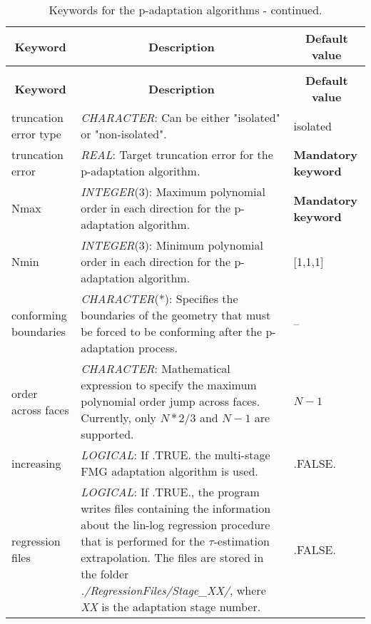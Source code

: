 \documentclass[a4paper,10pt]{report}
\begin{document}
\begin{longtable}{|p{4cm}|p{10cm}|p{2.2cm}|}
\caption{Keywords for the p-adaptation algorithms.} \label{tab:pAdaptationKey} \\
\hline
\multicolumn{1}{|c|}{\textbf{Keyword}} & \multicolumn{1}{c|}{\textbf{Description}} & \multicolumn{1}{c|}{\textbf{Default value}} \\ \hline
\endfirsthead

\caption{Keywords for the p-adaptation algorithms - continued.} \\
\hline
\multicolumn{1}{|c|}{\textbf{Keyword}} & \multicolumn{1}{c|}{\textbf{Description}} & \multicolumn{1}{c|}{\textbf{Default value}} \\ \hline
\endhead

truncation error type & \textit{CHARACTER}: Can be either "isolated" or "non-isolated". & isolated \\ \hline

truncation error & \textit{REAL}: Target truncation error for the p-adaptation algorithm. & \textbf{Mandatory keyword} \\ \hline

Nmax          & \textit{INTEGER}(3): Maximum polynomial order in each direction for the p-adaptation algorithm. & 
					\textbf{Mandatory keyword} \\ \hline

Nmin          & \textit{INTEGER}(3): Minimum polynomial order in each direction for the p-adaptation algorithm. & 
					[1,1,1] \\ \hline

conforming boundaries & \textit{CHARACTER}(*): Specifies the boundaries of the geometry that must be forced to be conforming after the p-adaptation process.  	  & 
					-- \\ \hline

order across faces &
			\textit{CHARACTER}: Mathematical expression to specify the maximum polynomial order jump across faces. Currently, only $N*2/3$ and $N-1$ are supported. &
					$N-1$ \\ \hline 

increasing & \textit{LOGICAL}: If .TRUE. the multi-stage FMG adaptation algorithm is used. & 
					.FALSE. \\ \hline

regression files &
			\textit{LOGICAL}: If .TRUE., the program writes files containing the information about the lin-log regression procedure that is performed for the $\tau$-estimation extrapolation. The files are stored in the folder \textit{./RegressionFiles/Stage\_XX/}, where \textit{XX} is the adaptation stage number. & 
			 		.FALSE. \\ \hline


\end{longtable}
\end{document}
